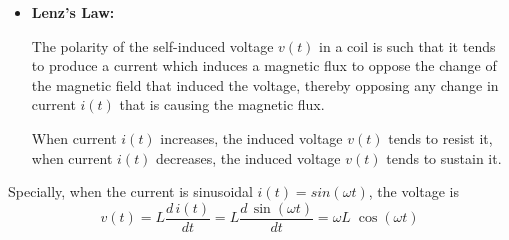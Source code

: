 \documentclass{article}
\begin{document}
\begin{itemize}
\begin{itemize}
  \item {\bf Lenz's Law:} 

    The polarity of the self-induced voltage $v(t)$ in a coil is such 
    that it tends to produce a current which induces a magnetic flux to 
    oppose the change of the magnetic field that induced the voltage, 
    thereby opposing any change in current $i(t)$ that is causing the 
    magnetic flux. 

    When current $i(t)$ increases, the induced voltage $v(t)$ tends to
    resist it, when current $i(t)$ decreases, the induced voltage
    $v(t)$ tends to sustain it.

  \end{itemize}

  \begin{comment}
    The ratio between the primary voltage $V_1$ and the secondary voltage 
    $V_2$ of a transformer is proportional to the ratio between the numbers 
    of turns:
    \begin{equation}
      \frac{V_2}{V_1}=\frac{n_2}{n_1}	
    \end{equation}
    If there is no power loss by the transformer, then the transformer is 
    ideal and we have
    \begin{equation}
      P_1=V_1I_1=P_2=V_2I_2,\;\;\;\;\mbox{i.e.}\;\;\;\;
    \frac{I_2}{I_1}=\frac{V_1}{V_2}=\frac{n_1}{n_2}	
    \end{equation}
    The ratio between the primary current $I_1$ and the secondary current $I_2$ 
    of a transformer is inversely proportional to the ratio between the numbers
    of turns. Also note the reference directions of the currents $I_1$ and $I_2$
    and the reference polarities of the voltages $V_1$ and $V_2$, reflecting the
    fact that the secondary current $I_2$ is caused by the induced voltage $V_2$
    (consistent polarity), while $V_1$ is the induced voltage opposing the current
    $I_1$.

    We can also find the ratio between the primary and secondary impedances based 
    on the assumption that there is no power loss in the transformer, i.e.,
    \begin{equation}	
      P_1=\frac{V_1^2}{R_1}=P_2=\frac{V_2^2}{R_2}, \;\;\;\;\;\;\;\;\;\;
    \frac{R_1}{R_2}=\left(\frac{V_1}{V_2}\right)^2=\left(\frac{n_1}{n_2}\right)^2  
    \end{equation}
  \end{comment}

  Specially, when the current is sinusoidal $i(t)=sin(\omega t)$, the 
  voltage is
  \begin{equation}
    v(t)=L \frac{d\,i(t)}{dt} =L \frac{d\,\sin(\omega t)}{dt} 
    = \omega L\;\cos(\omega t)
  \end{equation}


\end{itemize}
\end{document}
